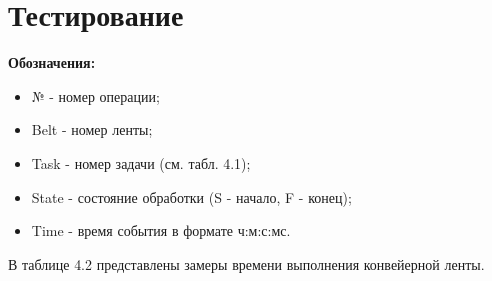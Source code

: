 \documentclass[12pt]{report}
\begin{document}
\section{Тестирование}
\begin{flushleft}
\textbf{Обозначения:}
\begin{itemize}
	\item № - номер операции;
	\item Belt - номер ленты;
	\item Task - номер задачи (см. табл. 4.1);
	\item State - состояние обработки (S - начало, F - конец);
	\item Time -  время события в формате ч:м:с:мс.
\end{itemize}
\end{flushleft}
\par
\begin{center}
	В таблице {4.2} представлены замеры времени выполнения конвейерной ленты.
\end{center}
\par
\end{document}
